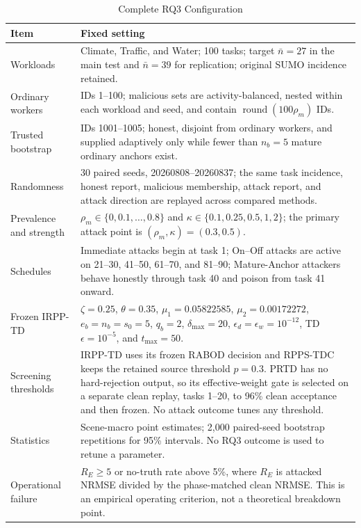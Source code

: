 \documentclass[journal]{IEEEtran}
\begin{document}
\begin{table}[!t]
\centering
\caption{Complete RQ3 Configuration}
\label{tab:rq3-settings}
\scriptsize
\setlength{\tabcolsep}{4.2pt}
\renewcommand{\arraystretch}{1.09}
\begin{tabular}{p{}p{}}
\toprule
Item & Fixed setting \\
\midrule
Workloads & Climate, Traffic, and Water; 100 tasks; target $\bar n=27$ in the main test and $\bar n=39$ for replication; original SUMO incidence retained. \\
Ordinary workers & IDs 1--100; malicious sets are activity-balanced, nested within each workload and seed, and contain $\operatorname{round}(100\rho_m)$ IDs. \\
Trusted bootstrap & IDs 1001--1005; honest, disjoint from ordinary workers, and supplied adaptively only while fewer than $n_b=5$ mature ordinary anchors exist. \\
Randomness & 30 paired seeds, 20260808--20260837; the same task incidence, honest report, malicious membership, attack report, and attack direction are replayed across compared methods. \\
Prevalence and strength & $\rho_m\in\{0,0.1,\ldots,0.8\}$ and $\kappa\in\{0.1,0.25,0.5,1,2\}$; the primary attack point is $(\rho_m,\kappa)=(0.3,0.5)$. \\
Schedules & Immediate attacks begin at task 1; On--Off attacks are active on 21--30, 41--50, 61--70, and 81--90; Mature-Anchor attackers behave honestly through task 40 and poison from task 41 onward. \\
Frozen IRPP-TD & $\zeta=0.25$, $\theta=0.35$, $\mu_1=0.05822585$, $\mu_2=0.00172272$, $e_b=n_b=s_0=5$, $q_b=2$, $\delta_{\max}=20$, $\epsilon_d=\epsilon_w=10^{-12}$, TD $\epsilon=10^{-5}$, and $t_{\max}=50$. \\
Screening thresholds & IRPP-TD uses its frozen RABOD decision and RPPS-TDC keeps the retained source threshold $p=0.3$. PRTD has no hard-rejection output, so its effective-weight gate is selected on a separate clean replay, tasks 1--20, to 96\% clean acceptance and then frozen. No attack outcome tunes any threshold. \\
Statistics & Scene-macro point estimates; 2,000 paired-seed bootstrap repetitions for 95\% intervals. No RQ3 outcome is used to retune a parameter. \\
Operational failure & $R_E\geq5$ or no-truth rate above 5\%, where $R_E$ is attacked NRMSE divided by the phase-matched clean NRMSE. This is an empirical operating criterion, not a theoretical breakdown point. \\
\bottomrule
\end{tabular}
\end{table}
\end{document}

